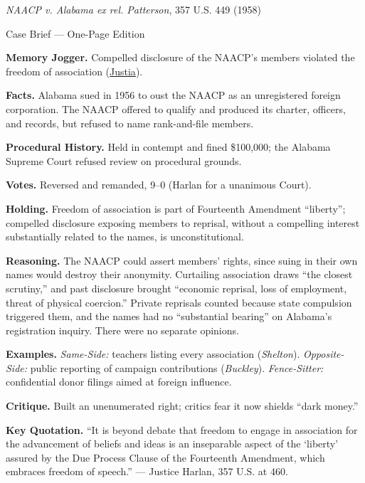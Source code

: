 \documentclass[12pt]{article}
\begin{document}
\begin{center}
{\Large \textit{NAACP v. Alabama ex rel. Patterson}, 357 U.S. 449 (1958)\par}
\vspace{0.3em}
{\normalsize Case Brief --- One-Page Edition\par}
\end{center}

\textbf{Memory Jogger.} Compelled disclosure of the NAACP's members violated the freedom of association (\href{https://supreme.justia.com/cases/federal/us/357/449/}{Justia}).

\textbf{Facts.} Alabama sued in 1956 to oust the NAACP as an unregistered foreign corporation. The NAACP offered to qualify and produced its charter, officers, and records, but refused to name rank-and-file members.

\textbf{Procedural History.} Held in contempt and fined \$100,000; the Alabama Supreme Court refused review on procedural grounds.

\textbf{Votes.} Reversed and remanded, 9--0 (Harlan for a unanimous Court).

\textbf{Holding.} Freedom of association is part of Fourteenth Amendment ``liberty''; compelled disclosure exposing members to reprisal, without a compelling interest substantially related to the names, is unconstitutional.

\textbf{Reasoning.} The NAACP could assert members' rights, since suing in their own names would destroy their anonymity. Curtailing association draws ``the closest scrutiny,'' and past disclosure brought ``economic reprisal, loss of employment, threat of physical coercion.'' Private reprisals counted because state compulsion triggered them, and the names had no ``substantial bearing'' on Alabama's registration inquiry. There were no separate opinions.

\textbf{Examples.} \emph{Same-Side:} teachers listing every association (\textit{Shelton}). \emph{Opposite-Side:} public reporting of campaign contributions (\textit{Buckley}). \emph{Fence-Sitter:} confidential donor filings aimed at foreign influence.

\textbf{Critique.} Built an unenumerated right; critics fear it now shields ``dark money.''

\textbf{Key Quotation.} ``It is beyond debate that freedom to engage in association for the advancement of beliefs and ideas is an inseparable aspect of the `liberty' assured by the Due Process Clause of the Fourteenth Amendment, which embraces freedom of speech.'' --- Justice Harlan, 357 U.S. at 460.
\end{document}
